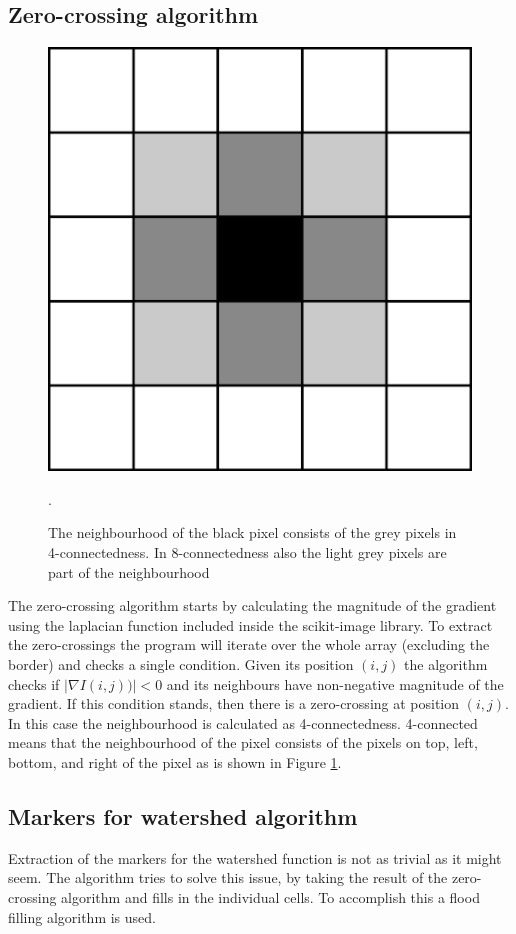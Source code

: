 \documentclass[
  digital,     %
  oneside,     %
  nosansbold,  %
  nocolorbold, %
  lof,         %
  lot,         %
]{fithesis4}
\begin{document}
\subsection{Zero-crossing algorithm}

\begin{figure}
    \begin{center}
        \includegraphics[width=0.3\linewidth]{resources/neighbourhood.png}
    \end{center}
    \caption{The neighbourhood of the black pixel consists of the grey pixels in
    4-connectedness. In 8-connectedness also the light grey pixels are part of the
    neighbourhood}.
    \label{fig:neighbourhood}
\end{figure}

The zero-crossing algorithm starts by calculating the magnitude of the gradient
using the laplacian function included inside the scikit-image library. To
extract the zero-crossings the program will iterate over the whole array
(excluding the border) and checks a single condition. Given its position $(i, j)$
the algorithm checks if $|\nabla I(i, j))| < 0$ and its neighbours have
non-negative magnitude of the gradient.  If this condition stands, then there is
a zero-crossing at position $(i, j)$. In this case the neighbourhood is
calculated as 4-connectedness. 4-connected means that the neighbourhood of the
pixel consists of the pixels on top, left, bottom, and right of the pixel as is
shown in Figure \ref{fig:neighbourhood}.

\subsection{Markers for watershed algorithm}
Extraction of the markers for the watershed function is not as trivial as it
might seem. The algorithm tries to solve this issue, by taking the result of the
zero-crossing algorithm and fills in the individual cells. To accomplish this
a flood filling algorithm is used.
\end{document}
